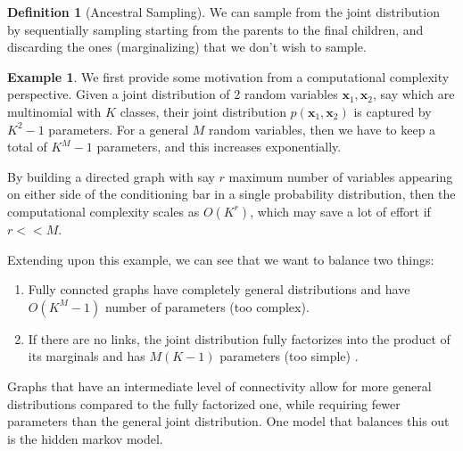 \documentclass{article}
\theoremstyle{definition}
\newtheorem{example}{Example}[section]
\theoremstyle{remark}
\theoremstyle{definition}
\newtheorem{definition}{Definition}[section]
\begin{document}
      \begin{definition}[Ancestral Sampling] 
      We can sample from the joint distribution by sequentially sampling starting from the parents to the final children, and discarding the ones (marginalizing) that we don't wish to sample. 
      \end{definition}


      \begin{example}
      We first provide some motivation from a computational complexity perspective. Given a joint distribution of 2 random variables $\mathbf{x}_1, \mathbf{x}_2$, say which are multinomial with $K$ classes, their joint distribution $p(\mathbf{x}_1, \mathbf{x}_2)$ is captured by $K^2 - 1$ parameters. For a general $M$ random variables, then we have to keep a total of $K^M - 1$ parameters, and this increases exponentially. 
      \begin{center}

      \end{center}
      By building a directed graph with say $r$ maximum number of variables appearing on either side of the conditioning bar in a single probability distribution, then the computational complexity scales as $O(K^r)$, which may save a lot of effort if $r << M$. 
      \end{example}

      Extending upon this example, we can see that we want to balance two things: 
      \begin{enumerate} 
        \item Fully conncted graphs have completely general distributions and have $O(K^M -1)$ number of parameters (too complex). 
        \item If there are no links, the joint distribution fully factorizes into the product of its marginals and has $M(K-1)$ parameters (too simple) . 
      \end{enumerate}
      Graphs that have an intermediate level of connectivity allow for more general distributions compared to the fully factorized one, while requiring fewer parameters than the general joint distribution. One model that balances this out is the hidden markov model. 
\end{document}

